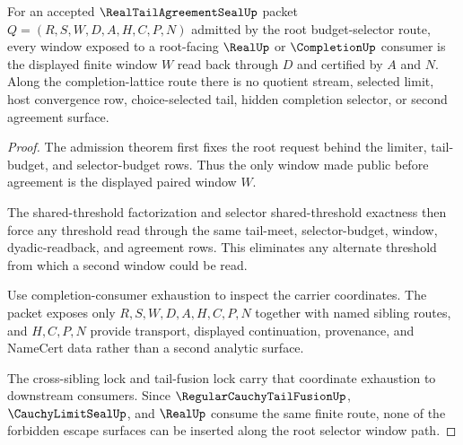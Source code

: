 \begin{theorem}
\label{thm:real-tail-agreement-seal-root-selector-window-nonescape}
For an accepted $\RealTailAgreementSealUp$ packet $Q=(R,S,W,D,A,H,C,P,N)$ admitted by the root budget-selector route, every window exposed to a root-facing $\RealUp$ or $\CompletionUp$ consumer is the displayed finite window $W$ read back through $D$ and certified by $A$ and $N$. Along the completion-lattice route there is no quotient stream, selected limit, host convergence row, choice-selected tail, hidden completion selector, or second agreement surface.
\end{theorem}
\begin{proof}
The admission theorem first fixes the root request behind the limiter, tail-budget, and selector-budget rows. Thus the only window made public before agreement is the displayed paired window $W$.

The shared-threshold factorization and selector shared-threshold exactness then force any threshold read through the same tail-meet, selector-budget, window, dyadic-readback, and agreement rows. This eliminates any alternate threshold from which a second window could be read.

Use completion-consumer exhaustion to inspect the carrier coordinates. The packet exposes only $R,S,W,D,A,H,C,P,N$ together with named sibling routes, and $H,C,P,N$ provide transport, displayed continuation, provenance, and NameCert data rather than a second analytic surface.

The cross-sibling lock and tail-fusion lock carry that coordinate exhaustion to downstream consumers. Since $\RegularCauchyTailFusionUp$, $\CauchyLimitSealUp$, and $\RealUp$ consume the same finite route, none of the forbidden escape surfaces can be inserted along the root selector window path.
\end{proof}

